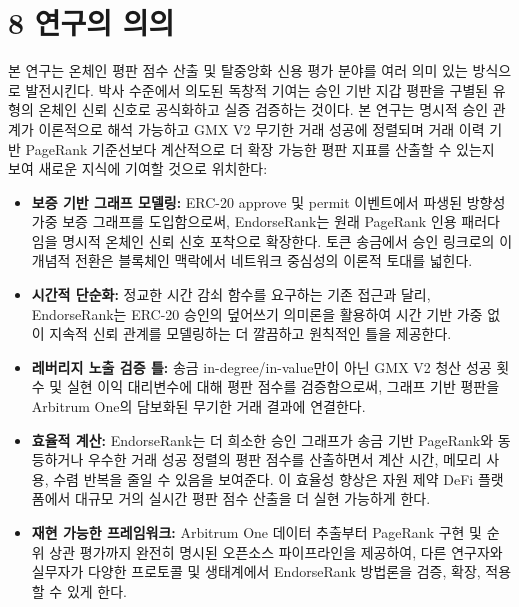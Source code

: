 \clearpage
{}
\section*{8 \textbf{연구의 의의}}
\label{sec:significance-of-research}

본 연구는 온체인 평판 점수 산출 및 탈중앙화 신용 평가 분야를 여러 의미 있는 방식으로 발전시킨다. 박사 수준에서 의도된 독창적 기여는 승인 기반 지갑 평판을 구별된 유형의 온체인 신뢰 신호로 공식화하고 실증 검증하는 것이다. 본 연구는 명시적 승인 관계가 이론적으로 해석 가능하고 GMX V2 무기한 거래 성공에 정렬되며 거래 이력 기반 PageRank 기준선보다 계산적으로 더 확장 가능한 평판 지표를 산출할 수 있는지 보여 새로운 지식에 기여할 것으로 위치한다:



\begin{itemize}
\item[\textbullet] \textbf{보증 기반 그래프 모델링:} ERC-20 approve 및 permit 이벤트에서 파생된 방향성 가중 보증 그래프를 도입함으로써, EndorseRank는 원래 PageRank 인용 패러다임을 명시적 온체인 신뢰 신호 포착으로 확장한다. 토큰 송금에서 승인 링크로의 이 개념적 전환은 블록체인 맥락에서 네트워크 중심성의 이론적 토대를 넓힌다.
\item[\textbullet] \textbf{시간적 단순화:} 정교한 시간 감쇠 함수를 요구하는 기존 접근과 달리, EndorseRank는 ERC-20 승인의 덮어쓰기 의미론을 활용하여 시간 기반 가중 없이 지속적 신뢰 관계를 모델링하는 더 깔끔하고 원칙적인 틀을 제공한다.
\item[\textbullet] \textbf{레버리지 노출 검증 틀:} 송금 in-degree/in-value만이 아닌 GMX V2 청산 성공 횟수 및 실현 이익 대리변수에 대해 평판 점수를 검증함으로써, 그래프 기반 평판을 Arbitrum One의 담보화된 무기한 거래 결과에 연결한다.
\end{itemize}

\begin{itemize}
\item[\textbullet] \textbf{효율적 계산:} EndorseRank는 더 희소한 승인 그래프가 송금 기반 PageRank와 동등하거나 우수한 거래 성공 정렬의 평판 점수를 산출하면서 계산 시간, 메모리 사용, 수렴 반복을 줄일 수 있음을 보여준다. 이 효율성 향상은 자원 제약 DeFi 플랫폼에서 대규모 거의 실시간 평판 점수 산출을 더 실현 가능하게 한다.
\item[\textbullet] \textbf{재현 가능한 프레임워크:} Arbitrum One 데이터 추출부터 PageRank 구현 및 순위 상관 평가까지 완전히 명시된 오픈소스 파이프라인을 제공하여, 다른 연구자와 실무자가 다양한 프로토콜 및 생태계에서 EndorseRank 방법론을 검증, 확장, 적용할 수 있게 한다.
\end{itemize}

